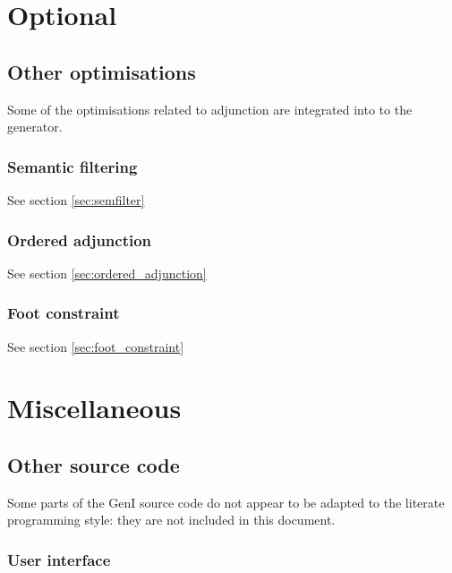 \documentclass[a4paper,11pt]{report}
\begin{document}
\part{Optional}

       
       
% 

\chapter{Other optimisations}
\label{chp:other_optimisations}

Some of the optimisations related to adjunction are integrated into
to the generator.

\section{Semantic filtering}

See section \ref{sec:semfilter}

\section{Ordered adjunction}

See section \ref{sec:ordered_adjunction}

\section{Foot constraint}

See section \ref{sec:foot_constraint}

\part{Miscellaneous}


%
%

\chapter{Other source code}
\label{cha:other}

Some parts of the GenI source code do not appear to be adapted to the
literate programming style: they are not included in this document.

\section{User interface}
\end{document}
